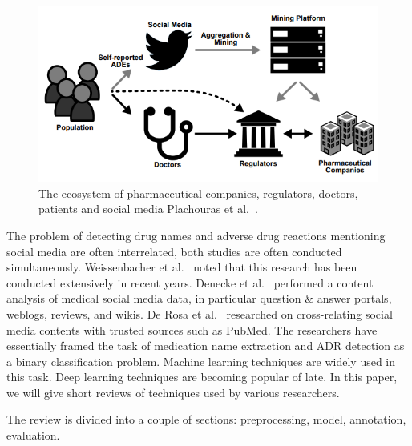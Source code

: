 \begin{figure}[h]
	\centering
	\includegraphics[width=0.99\linewidth]{Figures/j.png}
	\caption{The ecosystem of pharmaceutical companies, regulators, doctors, patients and social media Plachouras et al.~\cite{plachouras2016quantifying}.}
	\label{fig:ecosystem-pharmaceutical}
\end{figure}

The problem of detecting drug names and adverse drug reactions mentioning social media are often interrelated, both studies are often conducted simultaneously. Weissenbacher et al.~\cite{weissenbacher2018overview} noted that this research has been conducted extensively in recent years. Denecke et al.~\cite{DENECKE20091870} performed a content analysis of medical social media data, in particular question \& answer portals, weblogs, reviews, and wikis. De Rosa et al.~\cite{de114pharmacovigilance} researched on cross-relating social media contents with trusted sources such as PubMed. The researchers have essentially framed the task of medication name extraction and ADR detection as a binary classification problem. Machine learning techniques are widely used in this task. Deep learning techniques are becoming popular of late. In this paper, we will give short reviews of techniques used by various researchers. 

The review is divided into a couple of sections: preprocessing, model, annotation, evaluation.